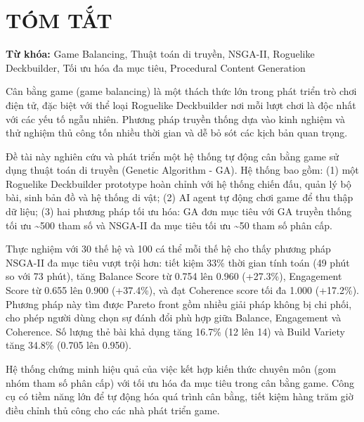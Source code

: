 \chapter*{TÓM TẮT}

\vspace{0.5cm}

\noindent\textbf{Từ khóa:} Game Balancing, Thuật toán di truyền, NSGA-II, Roguelike Deckbuilder, Tối ưu hóa đa mục tiêu, Procedural Content Generation

\vspace{1cm}

Cân bằng game (game balancing) là một thách thức lớn trong phát triển trò chơi điện tử, đặc biệt với thể loại Roguelike Deckbuilder nơi mỗi lượt chơi là độc nhất với các yếu tố ngẫu nhiên. Phương pháp truyền thống dựa vào kinh nghiệm và thử nghiệm thủ công tốn nhiều thời gian và dễ bỏ sót các kịch bản quan trọng.

Đề tài này nghiên cứu và phát triển một hệ thống tự động cân bằng game sử dụng thuật toán di truyền (Genetic Algorithm - GA). Hệ thống bao gồm: (1) một Roguelike Deckbuilder prototype hoàn chỉnh với hệ thống chiến đấu, quản lý bộ bài, sinh bản đồ và hệ thống di vật; (2) AI agent tự động chơi game để thu thập dữ liệu; (3) hai phương pháp tối ưu hóa: GA đơn mục tiêu với GA truyền thống tối ưu \~{}500 tham số và NSGA-II đa mục tiêu tối ưu \~{}50 tham số phân cấp.

Thực nghiệm với 30 thế hệ và 100 cá thể mỗi thế hệ cho thấy phương pháp NSGA-II đa mục tiêu vượt trội hơn: tiết kiệm 33\% thời gian tính toán (49 phút so với 73 phút), tăng Balance Score từ 0.754 lên 0.960 (+27.3\%), Engagement Score từ 0.655 lên 0.900 (+37.4\%), và đạt Coherence score tối đa 1.000 (+17.2\%). Phương pháp này tìm được Pareto front gồm nhiều giải pháp không bị chi phối, cho phép người dùng chọn sự đánh đổi phù hợp giữa Balance, Engagement và Coherence. Số lượng thẻ bài khả dụng tăng 16.7\% (12 lên 14) và Build Variety tăng 34.8\% (0.705 lên 0.950).

Hệ thống chứng minh hiệu quả của việc kết hợp kiến thức chuyên môn (gom nhóm tham số phân cấp) với tối ưu hóa đa mục tiêu trong cân bằng game. Công cụ có tiềm năng lớn để tự động hóa quá trình cân bằng, tiết kiệm hàng trăm giờ điều chỉnh thủ công cho các nhà phát triển game.
